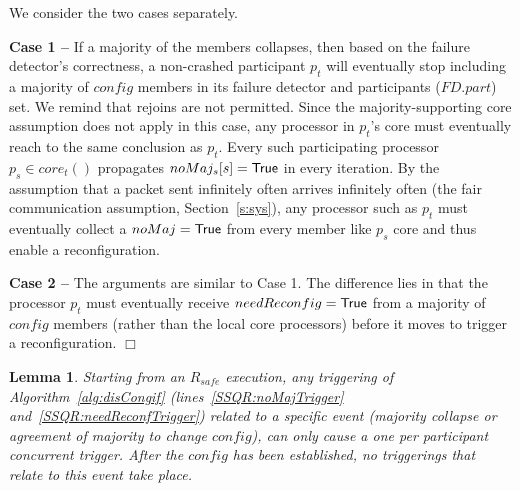 \documentclass[11pt]{article}
\newtheorem{lemma}[theorem]{Lemma}
\newenvironment{proof}{\noindent{\bf Proof.}}{\hfill$\Box$}
\begin{document}
\begin{proof} We consider the two cases separately.

\noindent \textbf{Case 1 --} 
If a majority of the members collapses, then based on the failure detector's correctness, a non-crashed participant $p_t$ will eventually stop including a majority of $config$ members in its failure detector and participants ($FD.part$) set.
We remind that rejoins are not permitted.
Since the majority-supporting core assumption does not apply in this case, any processor in $p_t$'s core must eventually reach to the same conclusion as $p_t$.
Every such participating processor $p_s \in core_t()$ propagates $noMaj_s[s] = \sf True$ in every iteration. 
By the assumption that a packet sent infinitely often arrives infinitely often (the fair communication assumption, Section~\ref{s:sys}), any processor such as $p_t$ must eventually collect a $noMaj = \sf True$ from every member like $p_s$ core and thus enable a reconfiguration.

\noindent \textbf{Case 2 --} 
The arguments are similar to Case 1. 
The difference lies in that the processor $p_t$ must eventually receive $needReconfig = {\sf True}$ from a majority of $config$ members (rather than the local core processors) before it moves to  trigger a reconfiguration.
\end{proof}


\begin{lemma}
\label{thQ:triggersControlled}
Starting from an $R_{safe}$ execution, any triggering of Algorithm~\ref{alg:disCongif} (lines~\ref{SSQR:noMajTrigger} and~\ref{SSQR:needReconfTrigger}) related to a specific event (majority collapse or agreement of majority to change $config$), can only cause a one per participant concurrent trigger. After the $config$ has been established, no triggerings that relate to this event take place.
\end{lemma}
\end{document}
